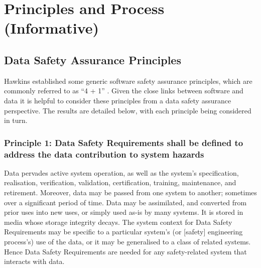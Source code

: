 %
%
\section{Principles and Process (Informative)} \label{bkm:principlesprocess}


\subsection{Data Safety Assurance Principles}
Hawkins  established some generic software safety assurance principles, which are commonly referred to as ``4 + 1'' \cite{citation:hawkins2013principles}. Given the close links between software and data it is helpful to consider these principles from a data safety assurance perspective. The results are detailed below, with each principle being considered in turn.

\subsubsection{Principle 1: Data Safety Requirements shall be defined to address the data contribution to system hazards}
Data pervades active system operation, as well as the system's specification, realisation, verification, validation, certification,  training, maintenance, and retirement. Moreover, data may be passed from one system to another; sometimes over a significant period of time. Data may be assimilated, and converted from prior uses into new uses, or simply used as-is by many systems. It is stored in media whose storage integrity decays. The system context for Data Safety Requirements may be specific to a particular system's (or [safety] engineering process's) use of the data, or it may be generalised to a class of related systems. Hence Data Safety Requirements are needed for any safety-related system that interacts with data.

